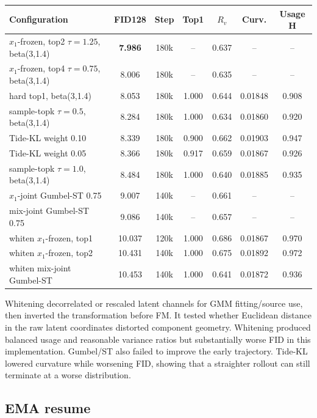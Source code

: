 \documentclass[11pt,a4paper]{article}
\newcommand{\best}[1]{\textbf{#1}}
\newcommand{\na}{--}
\begin{document}
\begin{center}
\small
\setlength{\tabcolsep}{3pt}
\begin{tabularx}{\linewidth}{@{}Y c c c c c c@{}}
\toprule
\textbf{Configuration} & \textbf{FID128} & \textbf{Step} &
\textbf{Top1} & \textbf{\(R_v\)} & \textbf{Curv.} &
\textbf{Usage H}\\
\midrule
\(x_1\)-frozen, top2 \(\tau=1.25\), beta(3,1.4) &
\best{7.986} & 180k & \na & 0.637 & \na & \na\\
\(x_1\)-frozen, top4 \(\tau=0.75\), beta(3,1.4) &
8.006 & 180k & \na & 0.635 & \na & \na\\
hard top1, beta(3,1.4) &
8.053 & 180k & 1.000 & 0.644 & 0.01848 & 0.908\\
sample-topk \(\tau=0.5\), beta(3,1.4) &
8.284 & 180k & 1.000 & 0.634 & 0.01860 & 0.920\\
Tide-KL weight 0.10 &
8.339 & 180k & 0.900 & 0.662 & 0.01903 & 0.947\\
Tide-KL weight 0.05 &
8.366 & 180k & 0.917 & 0.659 & 0.01867 & 0.926\\
sample-topk \(\tau=1.0\), beta(3,1.4) &
8.484 & 180k & 1.000 & 0.640 & 0.01885 & 0.935\\
\(x_1\)-joint Gumbel-ST 0.75 &
9.007 & 140k & \na & 0.661 & \na & \na\\
mix-joint Gumbel-ST 0.75 &
9.086 & 140k & \na & 0.657 & \na & \na\\
whiten \(x_1\)-frozen, top1 &
10.037 & 120k & 1.000 & 0.686 & 0.01867 & 0.970\\
whiten \(x_1\)-frozen, top2 &
10.431 & 140k & 1.000 & 0.675 & 0.01892 & 0.972\\
whiten mix-joint Gumbel-ST &
10.453 & 140k & 1.000 & 0.641 & 0.01872 & 0.936\\
\bottomrule
\end{tabularx}
\end{center}

Whitening decorrelated or rescaled latent channels for GMM fitting/source use,
then inverted the transformation before FM. It tested whether Euclidean
distance in the raw latent coordinates distorted component geometry.
Whitening produced balanced usage and reasonable variance ratios but
substantially worse FID in this implementation. Gumbel/ST also failed to
improve the early trajectory. Tide-KL lowered curvature while worsening FID,
showing that a straighter rollout can still terminate at a worse distribution.

\subsection{EMA resume}
\end{document}

